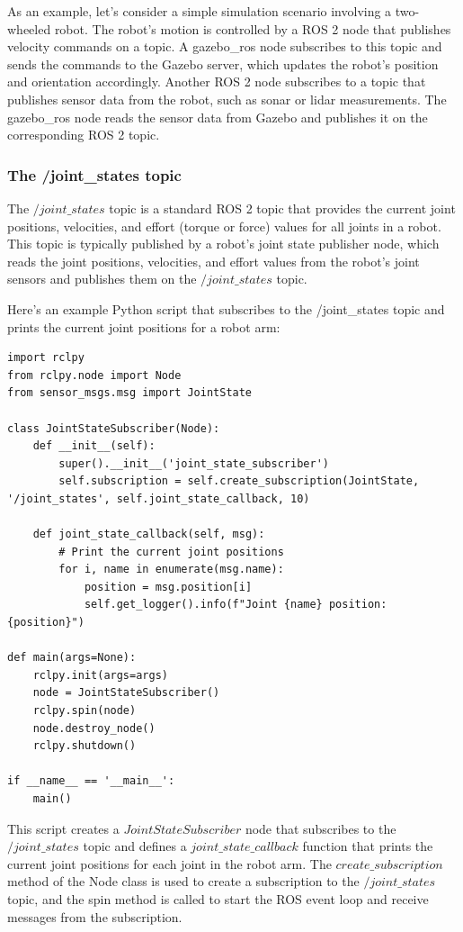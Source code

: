 \documentclass[12pt,oneside]{article}
\begin{document}
As an example, let's consider a simple simulation scenario involving a two-wheeled robot. The robot's motion is controlled by a ROS 2 node that publishes velocity commands on a topic. A gazebo\_ros node subscribes to this topic and sends the commands to the Gazebo server, which updates the robot's position and orientation accordingly. Another ROS 2 node subscribes to a topic that publishes sensor data from the robot, such as sonar or lidar measurements. The gazebo\_ros node reads the sensor data from Gazebo and publishes it on the corresponding ROS 2 topic.


\subsubsection{The /joint\_states topic}\label{ros2-joint-state}
The $/joint\_states$ topic is a standard ROS 2 topic that provides the current joint positions, velocities, and effort (torque or force) values for all joints in a robot. This topic is typically published by a robot's joint state publisher node, which reads the joint positions, velocities, and effort values from the robot's joint sensors and publishes them on the $/joint\_states$ topic.

Here's an example Python script that subscribes to the /joint\_states topic and prints the current joint positions for a robot arm:
\begin{verbatim}
import rclpy
from rclpy.node import Node
from sensor_msgs.msg import JointState

class JointStateSubscriber(Node):
    def __init__(self):
        super().__init__('joint_state_subscriber')
        self.subscription = self.create_subscription(JointState, '/joint_states', self.joint_state_callback, 10)

    def joint_state_callback(self, msg):
        # Print the current joint positions
        for i, name in enumerate(msg.name):
            position = msg.position[i]
            self.get_logger().info(f"Joint {name} position: {position}")

def main(args=None):
    rclpy.init(args=args)
    node = JointStateSubscriber()
    rclpy.spin(node)
    node.destroy_node()
    rclpy.shutdown()

if __name__ == '__main__':
    main()
\end{verbatim}
This script creates a $JointStateSubscriber$ node that subscribes to the $/joint\_states$ topic and defines a $joint\_state\_callback$ function that prints the current joint positions for each joint in the robot arm. The $create\_subscription$ method of the Node class is used to create a subscription to the $/joint\_states$ topic, and the spin method is called to start the ROS event loop and receive messages from the subscription.
\end{document}
